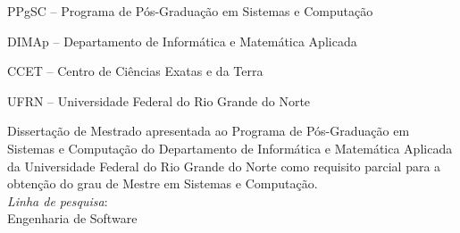 
\titulo{\Large{\mscThesisTitle}}
\autor{\author}
\orientador[Orientador]{\par \advisor}

\ifcoadvisor
\coorientador[Coorientador]{\par \coadvisor}
\fi

\instituicao
{
	PPgSC -- Programa de Pós-Graduação em Sistemas e Computação\par 
	DIMAp -- Departamento de Informática e Matemática Aplicada\par
   CCET -- Centro de Ciências Exatas e da Terra\par
   UFRN -- Universidade Federal do Rio Grande do Norte
}
	
\comentario
{
	Dissertação de Mestrado apresentada ao Programa de Pós-Graduação em Sistemas e Computação do Departamento de Informática e Matemática Aplicada da Universidade Federal do Rio Grande do Norte como requisito parcial para a obtenção do grau de Mestre em Sistemas e Computação.\bigskip\\
   \textit{Linha de pesquisa}:\\Engenharia de Software
}
		
\local{\city}
\data{\date}
	
\folhaderosto
